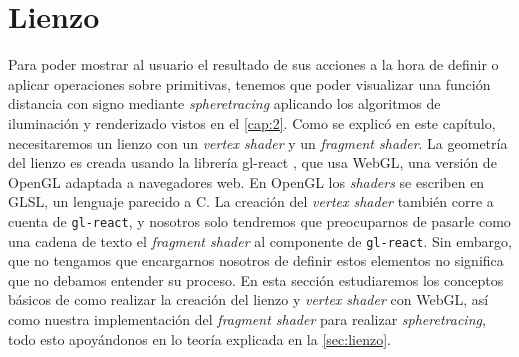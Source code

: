 \section{Lienzo}\label{sec:lienzoImplem}
Para poder mostrar al usuario el resultado de sus acciones a la hora de definir o aplicar operaciones sobre primitivas, tenemos que poder visualizar una función distancia con signo mediante \textit{spheretracing} aplicando los algoritmos de iluminación y renderizado vistos en el \autoref{cap:2}. Como se explicó en este capítulo, necesitaremos un lienzo con un \textit{vertex shader} y un \textit{fragment shader}. La geometría del lienzo es creada usando la librería gl-react \cite{gl-react}, que usa WebGL, una versión de OpenGL adaptada a navegadores web. En OpenGL los \textit{shaders} se escriben en GLSL, un lenguaje parecido a C. La creación del \textit{vertex shader} también corre a cuenta de \texttt{gl-react}, y nosotros solo tendremos que preocuparnos de pasarle como una cadena de texto el \textit{fragment shader} al componente de \texttt{gl-react}. Sin embargo, que no tengamos que encargarnos nosotros de definir estos elementos no significa que no debamos entender su proceso. En esta sección estudiaremos los conceptos básicos de como realizar la creación del lienzo y \textit{vertex shader} \cite{webgl} con WebGL, así como nuestra implementación del \textit{fragment shader} para realizar \textit{spheretracing}, todo esto apoyándonos en lo teoría explicada en la \autoref{sec:lienzo}.\newline



